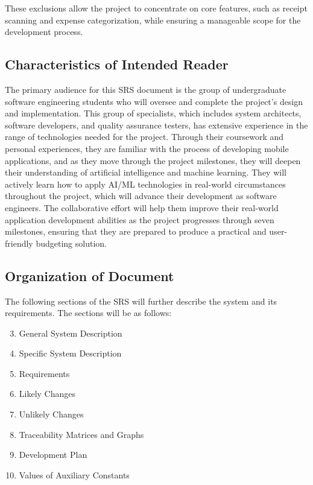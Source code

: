 \documentclass[12pt]{article}
\begin{document}
\noindent These exclusions allow the project to concentrate on core features, such as receipt scanning and expense categorization, while ensuring a manageable scope for the development process.

\subsection{Characteristics of Intended Reader} \label{sec_IntendedReader}
The primary audience for this SRS document is the group of undergraduate software engineering students who will 
oversee and complete the project’s design and implementation. This group of specialists, which includes system architects, 
software developers, and quality assurance testers, has extensive experience in the range of technologies needed for 
the project. Through their coursework and personal experiences, they are familiar with the process of developing mobile 
applications, and as they move through the project milestones, they will deepen their understanding of artificial intelligence 
and machine learning. They will actively learn how to apply AI/ML technologies in real-world circumstances throughout 
the project, which will advance their development as software engineers. The collaborative effort will help them improve 
their real-world application development abilities as the project progresses through seven milestones, ensuring that they 
are prepared to produce a practical and user-friendly budgeting solution.
\subsection{Organization of Document}

The following sections of the SRS will further describe the system and its requirements. The sections will be as follows:

\begin{enumerate}
	\setcounter{enumi}{2}
	\item General System Description
	\item Specific System Description
	\item Requirements
	\item Likely Changes
	\item Unlikely Changes
	\item Traceability Matrices and Graphs
	\item Development Plan
	\item Values of Auxiliary Constants
\end{enumerate}
\end{document}
